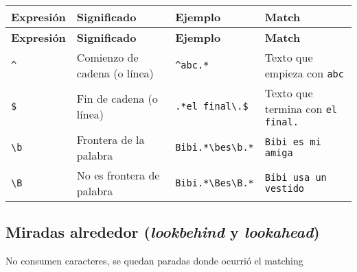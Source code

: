 \documentclass[a4paper, 10pt]{article}
\begin{document}
\begin{longtable}{@{} p{2cm} p{7.5cm} p{3cm} p{5cm} @{}}
\toprule
\textbf{Expresión} & \textbf{Significado} & \textbf{Ejemplo} & \textbf{Match} \\
\midrule
\endfirsthead
\toprule
\textbf{Expresión} & \textbf{Significado} & \textbf{Ejemplo} & \textbf{Match} \\
\midrule
\endhead
\bottomrule
\endfoot
\bottomrule
\endlastfoot

\centering \verb!^!  & Comienzo de cadena (o línea) & \verb!^abc.*!         & Texto que empieza con \verb!abc!       \\
\centering \verb!$!  & Fin de cadena (o línea)      & \verb!.*el final\.$!  & Texto que termina con \verb!el final.! \\
\centering \verb!\b! & Frontera de la palabra       & \verb!Bibi.*\bes\b.*! & \verb!Bibi es mi amiga!                \\
\centering \verb!\B! & No es frontera de palabra    & \verb!Bibi.*\Bes\B.*! & \verb!Bibi usa un vestido!             \\
\end{longtable}


\subsection*{Miradas alrededor (\textit{lookbehind} y \textit{lookahead})}

No consumen caracteres, se quedan paradas donde ocurrió el matching
\end{document}
